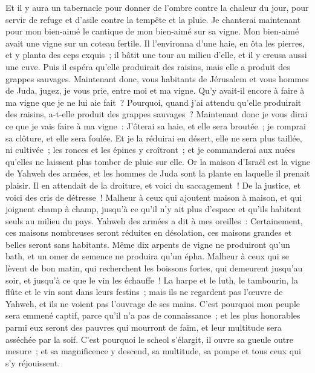 \begin{multicols}{2}
Et il y aura un tabernacle pour donner de l'ombre contre la chaleur du jour, pour servir de refuge et d'asile contre la tempête et la pluie.
\VerseOne{}Je chanterai maintenant pour mon bien-aimé le cantique de mon bien-aimé sur sa vigne. Mon bien-aimé avait une vigne sur un coteau fertile.
Il l'environna d'une haie, en ôta les pierres, et y planta des ceps exquis~; il bâtit une tour au milieu d'elle, et il y creusa aussi une cuve. Puis il espéra qu'elle produirait des raisins, mais elle a produit des grappes sauvages.
Maintenant donc, vous habitants de Jérusalem et vous hommes de Juda, jugez, je vous prie, entre moi et ma vigne.
Qu'y avait-il encore à faire à ma vigne que je ne lui aie fait~? Pourquoi, quand j'ai attendu qu'elle produirait des raisins, a-t-elle produit des grappes sauvages~?
Maintenant donc je vous dirai ce que je vais faire à ma vigne~: J'ôterai sa haie, et elle sera broutée~; je romprai sa clôture, et elle sera foulée.
Et je la réduirai en désert, elle ne sera plus taillée, ni cultivée~; les ronces et les épines y croîtront~; et je commanderai aux nuées qu'elles ne laissent plus tomber de pluie sur elle.
Or la maison d'Israël est la vigne de Yahweh des armées, et les hommes de Juda sont la plante en laquelle il prenait plaisir. Il en attendait de la droiture, et voici du saccagement~! De la justice, et voici des cris de détresse~!
Malheur à ceux qui ajoutent maison à maison, et qui joignent champ à champ, jusqu'à ce qu'il n'y ait plus d'espace et qu'ils habitent seuls au milieu du pays.
Yahweh des armées a dit à mes oreilles~: Certainement, ces maisons nombreuses seront réduites en désolation, ces maisons grandes et belles seront sans habitants.
Même dix arpents de vigne ne produiront qu'un bath, et un omer de semence ne produira qu'un épha.
Malheur à ceux qui se lèvent de bon matin, qui recherchent les boissons fortes, qui demeurent jusqu'au soir, et jusqu'à ce que le vin les échauffe~!
La harpe et le luth, le tambourin, la flûte et le vin sont dans leurs festins~; mais ils ne regardent pas l'œuvre de Yahweh, et ils ne voient pas l'ouvrage de ses mains.
C'est pourquoi mon peuple sera emmené captif, parce qu'il n'a pas de connaissance~; et les plus honorables parmi eux seront des pauvres qui mourront de faim, et leur multitude sera asséchée par la soif.
C'est pourquoi le scheol s'élargit, il ouvre sa gueule outre mesure~; et sa magnificence y descend, sa multitude, sa pompe et tous ceux qui s'y réjouissent.

\end{multicols}
